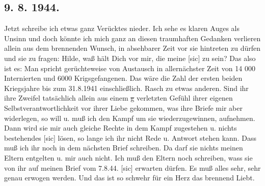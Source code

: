 \subsection{9. 8. 1944.}

Jetzt schreibe ich etwas ganz Ver\"{u}cktes nieder.
Ich sehe es klaren Auges als Unsinn und doch k\"{o}nnte ich mich ganz an diesen traumhaften Gedanken verlieren allein aus dem brennenden Wunsch, in absehbarer Zeit vor sie hintreten zu d\"{u}rfen und sie zu fragen: Hilde, wa{\ss} h\"{a}lt Dich vor mir, die meine{\color{red} [sic] } zu sein?
Das also ist es: Man spricht ger\"{u}chteweise von Austausch in allern\"{a}chster Zeit von 14 000 Internierten und 6000 Krigsgefangenen.
Das w\"{a}re die Zahl der ersten beiden Kriegsjahre bis zum 31.8.1941 einschlie{\ss}lich.
\hline
Rasch zu etwas anderen.
Sind ihr ihre Zweifel tats\"{a}chlich allein aus einem \st{g} verletzten Gef\"{u}hl ihrer eigenen Selbstverantwortlichkeit vor ihrer Liebe gekommen, was ihre Briefe mir aber widerlegen, so will u. mu{\ss} ich den Kampf um sie wiederzugewinnen, aufnehmen.
Dann wird sie mir auch gleiche Rechte in dem Kampf zugestehen u. nichts bestehendes{\color{red} [sic] } l\"{o}sen, so lange ich ihr nicht Rede u. Antwort stehen kann.
Dass mu{\ss} ich ihr noch in dem n\"{a}chsten Brief schreiben.
Da darf sie nichts meinen Eltern entgelten u. mir auch nicht.
Ich mu{\ss} den Eltern noch schreiben, wass sie von ihr auf meinen Brief vom 7.8.44.{\color{red} [sic] } erwarten d\"{u}rfen.
Es mu{\ss} alles sehr, sehr genau erwogen werden.
Und das ist so schwehr f\"{u}r ein Herz das brennend Liebt.

\clearpage
